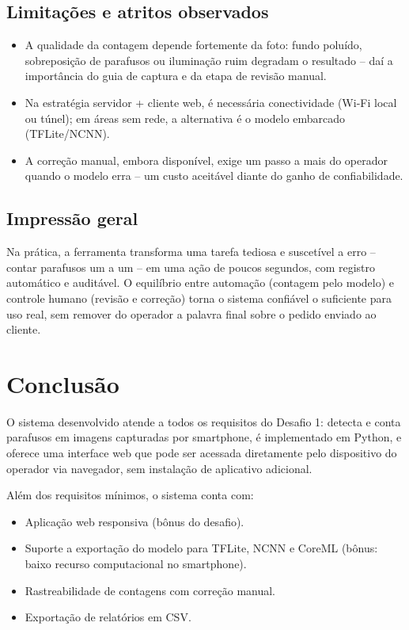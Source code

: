 \documentclass[12pt,a4paper]{article}
\begin{document}
\subsection{Limita\c{c}\~oes e atritos observados}

\begin{itemize}[leftmargin=*]
  \item A qualidade da contagem depende fortemente da foto: fundo polu\'ido, sobreposi\c{c}\~ao
        de parafusos ou ilumina\c{c}\~ao ruim degradam o resultado -- da\'i a import\^ancia
        do guia de captura e da etapa de revis\~ao manual.
  \item Na estrat\'egia servidor + cliente web, \'e necess\'aria conectividade (Wi-Fi local
        ou t\'unel); em \'areas sem rede, a alternativa \'e o modelo embarcado (TFLite/NCNN).
  \item A corre\c{c}\~ao manual, embora dispon\'ivel, exige um passo a mais do operador
        quando o modelo erra -- um custo aceit\'avel diante do ganho de confiabilidade.
\end{itemize}

\subsection{Impress\~ao geral}

Na pr\'atica, a ferramenta transforma uma tarefa tediosa e suscet\'ivel a erro -- contar
parafusos um a um -- em uma a\c{c}\~ao de poucos segundos, com registro autom\'atico e
audit\'avel. O equil\'ibrio entre automa\c{c}\~ao (contagem pelo modelo) e controle humano
(revis\~ao e corre\c{c}\~ao) torna o sistema confi\'avel o suficiente para uso real, sem
remover do operador a palavra final sobre o pedido enviado ao cliente.

\section{Conclus\~ao}

O sistema desenvolvido atende a todos os requisitos do Desafio 1: detecta e conta
parafusos em imagens capturadas por smartphone, \'e implementado em Python, e oferece
uma interface web que pode ser acessada diretamente pelo dispositivo do operador via
navegador, sem instala\c{c}\~ao de aplicativo adicional.

Al\'em dos requisitos m\'inimos, o sistema conta com:
\begin{itemize}[leftmargin=*]
  \item Aplica\c{c}\~ao web responsiva (bônus do desafio).
  \item Suporte a exporta\c{c}\~ao do modelo para TFLite, NCNN e CoreML
        (bônus: baixo recurso computacional no smartphone).
  \item Rastreabilidade de contagens com corre\c{c}\~ao manual.
  \item Exporta\c{c}\~ao de relat\'orios em CSV.
\end{itemize}
\end{document}

